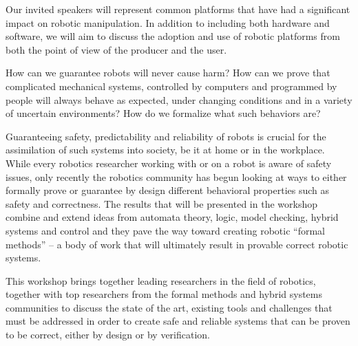 \begin{spacing}{1.0}
{Our invited speakers will represent common platforms that have had a significant impact on robotic manipulation. In addition to including both hardware and software, we will aim to discuss the adoption and use of robotic platforms from both the point of view of the producer  and the user.
}


{
How can we guarantee robots will never cause harm? How can we prove that complicated mechanical systems, controlled by computers and programmed by people will always behave as expected, under changing conditions and in a variety of uncertain environments?  How do we formalize what such behaviors are?

Guaranteeing safety, predictability and reliability of robots is crucial for the assimilation of such systems into society, be it at home or in the workplace. While every robotics researcher working with or on a robot is aware of safety issues, only recently the robotics community has begun looking at ways to either formally prove or guarantee by design different behavioral properties such as safety and correctness. The results that will be presented in the workshop combine and extend ideas from automata theory, logic, model checking, hybrid systems and control and they pave the way toward creating robotic “formal methods” – a body of work that will ultimately result in provable correct robotic systems.

This workshop brings together leading researchers in the field of robotics, together with top researchers from the formal methods and hybrid systems communities to discuss the state of the art, existing tools and challenges that must be addressed in order to create safe and reliable systems that can be proven to be correct, either by design or by verification. 
}



\end{spacing}
